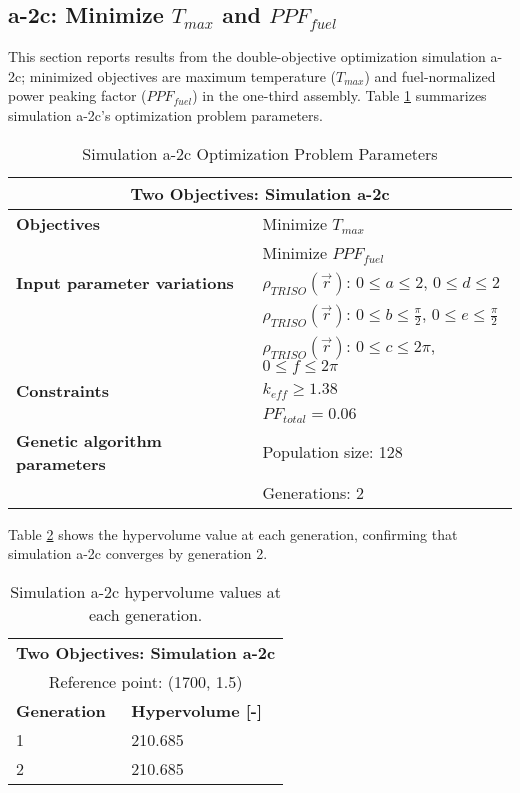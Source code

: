 \subsection{a-2c: Minimize $T_{max}$ and $PPF_{fuel}$}
\label{sec:a-2c}
This section reports results from the double-objective optimization simulation a-2c; 
minimized objectives are maximum temperature ($T_{max}$) and fuel-normalized power 
peaking factor ($PPF_{fuel}$) in the one-third assembly.  
Table \ref{tab:simulationa2c} summarizes simulation a-2c's optimization problem 
parameters. 
\begin{table}[htbp!]
    \centering
    \onehalfspacing
    \caption{Simulation a-2c Optimization Problem Parameters}
	\label{tab:simulationa2c}
    \footnotesize
    \begin{tabular}{l|p{5.3cm}}
    \hline 
    \multicolumn{2}{c}{\textbf{Two Objectives: Simulation a-2c}} \\
    \hline 
    \textbf{Objectives} & Minimize $T_{max}$ \\
    & Minimize $PPF_{fuel}$ \\
    \hline 
    \textbf{Input parameter variations}
    & $\rho_{TRISO}(\vec{r})$: $0 \leq a \leq 2$, $0 \leq d \leq 2$\\
    & $\rho_{TRISO}(\vec{r})$: $0 \leq b \leq \frac{\pi}{2}$, $0 \leq e \leq \frac{\pi}{2}$\\
    & $\rho_{TRISO}(\vec{r})$: $0 \leq c \leq 2\pi$, $0 \leq f \leq 2\pi$\\
    \hline
    \textbf{Constraints} & $k_{eff} \geq 1.38$\\ 
    & $PF_{total} = 0.06$\\
    \hline 
    \textbf{Genetic algorithm parameters} & Population size: 128 \\
    & Generations: 2 \\
    \hline
    \end{tabular}
\end{table}
Table \ref{tab:a2c-hypervolume} shows the hypervolume value at each generation, 
confirming that simulation a-2c converges by generation 2. 
\begin{table}[htbp!]
    \centering
    \onehalfspacing
    \caption{Simulation a-2c hypervolume values at each generation.}
	\label{tab:a2c-hypervolume}
    \footnotesize
    \begin{tabular}{ll}
    \hline 
    \multicolumn{2}{c}{\textbf{Two Objectives: Simulation a-2c}} \\
    \multicolumn{2}{c}{Reference point: (1700, 1.5)} \\
    \hline 
    \textbf{Generation} & \textbf{Hypervolume [-]} \\
    \hline
    1 & 210.685 \\
    2 & 210.685 \\
    \hline
    \end{tabular}
\end{table}

